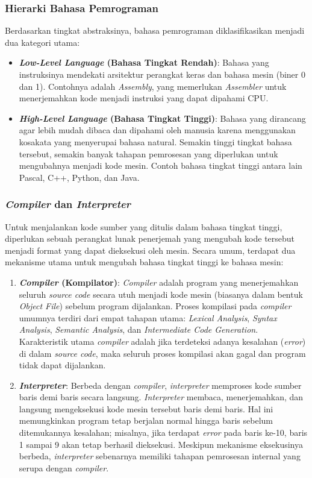 ﻿\documentclass[12pt,a4paper]{article}
\begin{document}
\subsubsection{Hierarki Bahasa Pemrograman}
Berdasarkan tingkat abstraksinya, bahasa pemrograman diklasifikasikan menjadi dua kategori utama:
\begin{itemize}
\item \textbf{\textit{Low-Level Language} (Bahasa Tingkat Rendah)}: Bahasa yang instruksinya mendekati arsitektur perangkat keras dan bahasa mesin (biner 0 dan 1). Contohnya adalah \textit{Assembly}, yang memerlukan \textit{Assembler} untuk menerjemahkan kode menjadi instruksi yang dapat dipahami CPU.
\item \textbf{\textit{High-Level Language} (Bahasa Tingkat Tinggi)}: Bahasa yang dirancang agar lebih mudah dibaca dan dipahami oleh manusia karena menggunakan kosakata yang menyerupai bahasa natural. Semakin tinggi tingkat bahasa tersebut, semakin banyak tahapan pemrosesan yang diperlukan untuk mengubahnya menjadi kode mesin. Contoh bahasa tingkat tinggi antara lain Pascal, C++, Python, dan Java.
\end{itemize}

\subsubsection{\textit{Compiler} dan \textit{Interpreter} }
Untuk menjalankan kode sumber yang ditulis dalam bahasa tingkat tinggi,
diperlukan sebuah perangkat lunak penerjemah yang mengubah kode tersebut menjadi
format yang dapat dieksekusi oleh mesin. Secara umum, terdapat dua mekanisme
utama untuk mengubah bahasa tingkat tinggi ke bahasa mesin:

\begin{enumerate}
\item \textbf{\textit{Compiler} (Kompilator)}:
\textit{Compiler} adalah program yang menerjemahkan seluruh \textit{source code}
secara utuh menjadi kode mesin (biasanya dalam bentuk \textit{Object File})
sebelum program dijalankan. Proses kompilasi pada \textit{compiler} umumnya
terdiri dari empat tahapan utama: \textit{Lexical Analysis}, \textit{Syntax
Analysis}, \textit{Semantic Analysis}, dan \textit{Intermediate Code
Generation}. Karakteristik utama \textit{compiler} adalah jika terdeteksi adanya
kesalahan (\textit{error}) di dalam \textit{source code}, maka seluruh proses
kompilasi akan gagal dan program tidak dapat dijalankan.

\item \textbf{\textit{Interpreter}}:
Berbeda dengan \textit{compiler}, \textit{interpreter} memproses kode sumber
baris demi baris secara langsung. \textit{Interpreter} membaca,
menerjemahkan, dan langsung mengeksekusi kode mesin tersebut baris demi baris.
Hal ini memungkinkan program tetap berjalan normal hingga baris sebelum
ditemukannya kesalahan; misalnya, jika terdapat \textit{error} pada baris ke-10,
baris 1 sampai 9 akan tetap berhasil dieksekusi. Meskipun mekanisme eksekusinya
berbeda, \textit{interpreter} sebenarnya memiliki tahapan pemrosesan internal
yang serupa dengan \textit{compiler}.

\end{enumerate}
\end{document}
